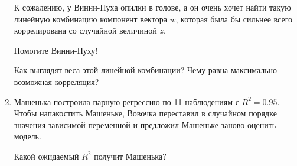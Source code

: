 \begin{enumerate}
   К сожалению, у Винни-Пуха опилки в голове, а он очень хочет найти такую линейную комбинацию
   компонент вектора $w$, которая была бы сильнее всего коррелирована со случайной
   величиной $z$.

   Помогите Винни-Пуху!

   Как выглядят веса этой линейной комбинации?
   Чему равна максимально возможная корреляция?

 \item Машенька построила парную регрессию по 11 наблюдениям с $R^2=
0.95$. Чтобы напакостить Машеньке, Вовочка переставил в случайном
порядке значения зависимой переменной и предложил Машеньке заново оценить модель.

Какой ожидаемый $R^2$ получит Машенька?


\end{enumerate}


